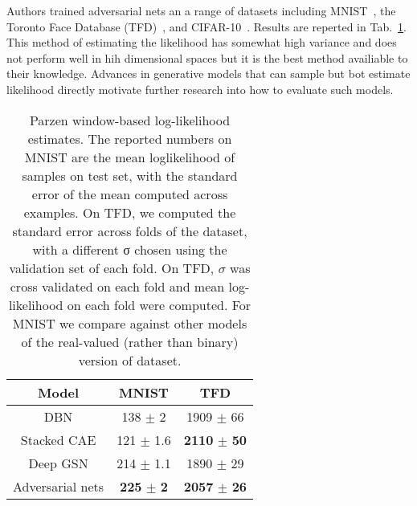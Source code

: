 \documentclass[10pt,twocolumn,letterpaper]{article}
\begin{document}
Authors trained adversarial nets an a range of datasets including MNIST~\cite{A}, the Toronto Face Database (TFD)~\cite{On}, and CIFAR-10~\cite{Auto}. Results are reperted in Tab.~\ref{tab}. This method of estimating the likelihood has somewhat high variance and does not perform well in hih dimensional spaces but it is the best method availiable to their knowledge. Advances in generative models that can sample but bot estimate likelihood directly motivate further research into how to evaluate such models.
\begin{table}
\begin{center}
\begin{tabular}{c|c|c}
  Model & MNIST & TFD \\
  \hline
  DBN & 138 $\pm$ 2 & 1909 $\pm$ 66 \\
  Stacked CAE & 121 $\pm$ 1.6 & {\bf 2110} $\pm$ {\bf 50}\\
  Deep GSN & 214 $\pm$ 1.1 & 1890 $\pm$ 29 \\
  Adversarial nets & {\bf 225} $\pm$ {\bf 2} & {\bf 2057} $\pm$ {\bf 26}\\
\end{tabular}
\end{center}
\caption{Parzen window-based log-likelihood estimates. The reported numbers on MNIST are the mean loglikelihood of samples on test set, with the standard error of the mean computed across examples. On TFD, we computed the standard error across folds of the dataset, with a different σ chosen using the validation set of each fold. On TFD, $\sigma$ was cross validated on each fold and mean log-likelihood on each fold were computed. For MNIST we compare against other models of the real-valued (rather than binary) version of dataset.
}
\label{tab}
\end{table}


{\small


}
\end{document}
